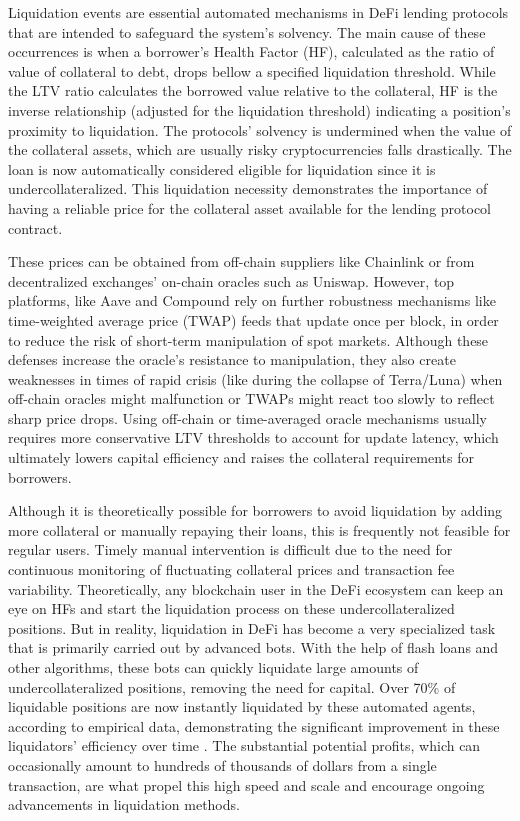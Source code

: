 \documentclass[11pt]{article} %
\begin{document}
Liquidation events are essential automated mechanisms in DeFi lending protocols that are intended to safeguard the system's solvency. The main cause of these occurrences is when a borrower's Health Factor (HF), calculated as the ratio of value of collateral to debt, drops bellow a specified liquidation threshold. While the LTV ratio calculates the borrowed value relative to the collateral, HF is the inverse relationship (adjusted for the liquidation threshold) indicating a position's proximity to liquidation. The protocols' solvency is undermined when the value of the collateral assets, which are usually risky cryptocurrencies falls drastically. The loan is now automatically considered eligible for liquidation since it is undercollateralized. This liquidation necessity demonstrates the importance of having a reliable price for the collateral asset available for the lending protocol contract.

These prices can be obtained from off-chain suppliers like Chainlink or from decentralized exchanges' on-chain oracles such as Uniswap. However, top platforms, like Aave and Compound rely on further robustness mechanisms like time-weighted average price (TWAP) feeds that update once per block, in order to reduce the risk of short-term manipulation of spot markets. Although these defenses increase the oracle's resistance to manipulation, they also create weaknesses in times of rapid crisis (like during the collapse of Terra/Luna) when off-chain oracles might malfunction or TWAPs might react too slowly to reflect sharp price drops. Using off-chain or time-averaged oracle mechanisms usually requires more conservative LTV thresholds to account for update latency, which ultimately lowers capital efficiency and raises the collateral requirements for borrowers.

Although it is theoretically possible for borrowers to avoid liquidation by adding more collateral or manually repaying their loans, this is frequently not feasible for regular users. Timely manual intervention is difficult due to the need for continuous monitoring of fluctuating collateral prices and transaction fee variability. Theoretically, any blockchain user in the DeFi ecosystem can keep an eye on HFs and start the liquidation process on these undercollateralized positions. But in reality, liquidation in DeFi has become a very specialized task that is primarily carried out by advanced bots. With the help of flash loans \citep{qin21} and other algorithms, these bots can quickly liquidate large amounts of undercollateralized positions, removing the need for capital. Over 70\% of liquidable positions are now instantly liquidated by these automated agents, according to empirical data, demonstrating the significant improvement in these liquidators' efficiency over time \citep{perez21}. The substantial potential profits, which can occasionally amount to hundreds of thousands of dollars from a single transaction, are what propel this high speed and scale and encourage ongoing advancements in liquidation methods.
\end{document}

